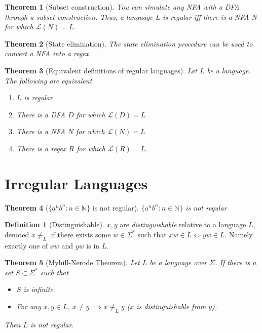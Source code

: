 \documentclass[12pt]{article}
\newtheorem{theorem}{Theorem}[section]
\theoremstyle{definition}
\newtheorem{definition}{Definition}[section]
\begin{document}
\begin{theorem}[Subset construction]
    You can simulate any NFA with a DFA through a subset construction. Thus, a language $L$ is regular iff there is a NFA $N$ for which $\mathcal{L}(N) = L$.
\end{theorem}

\begin{theorem}[State elimination]
    The state elimination procedure can be used to convert a NFA into a regex.
\end{theorem}

\begin{theorem}[Equivalent definitions of regular languages]
    Let $L$ be a language. The following are equivalent
    \begin{enumerate}
        \item $L$ is regular.
        \item There is a DFA $D$ for which $\mathcal{L}(D) = L$
        \item There is a NFA $N$ for which $\mathcal{L}(N) = L$
        \item There is a regex $R$ for which $\mathcal{L}(R) = L$.
    \end{enumerate}
\end{theorem}

\section{Irregular Languages}

\begin{theorem}[$\{a^nb^n: n \in \mathbb{N}\}$ is not regular]
    $\{a^nb^n: n \in \mathbb{N}\}$ is not regular
\end{theorem}

\begin{definition}[Distinguishable]
    $x, y$ are \emph{distinguishable} relative to a language $L$, denoted $x \not \equiv_L$ if there exists some $w  \in \Sigma^*$ such that $xw \in L \iff yw \in L$. Namely exactly one of $xw$ and $yw$ is in $L$.
\end{definition}

\begin{theorem}[Myhill-Nerode Theorem]
    Let $L$ be a language over $\Sigma$. If there is a set $S \subset \Sigma^*$ such that 
    \begin{itemize}
        \item $S$ is infinite
        \item For any $x, y \in L$, $x \neq y \implies x \not\equiv_L y$ ($x$ is distinguishable from $y$),
    \end{itemize}
    Then $L$ is not regular.
\end{theorem}
\end{document}
